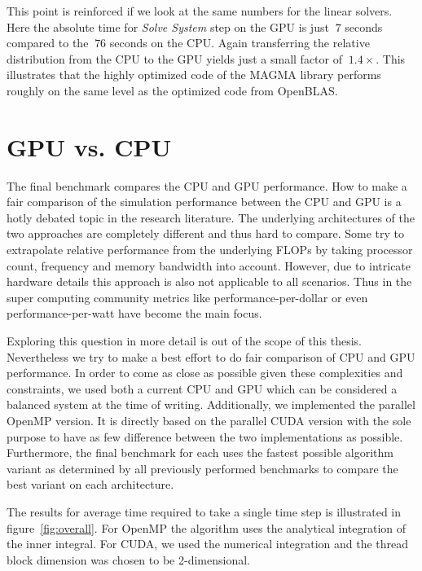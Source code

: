 \documentclass[a4paper,11pt]{kth-mag}
\begin{document}
This point is reinforced if we look at the same numbers for the linear solvers. Here the absolute time for \emph{Solve System} step on the GPU is just $~7$ seconds compared to the $~76$ seconds on the CPU. Again transferring the relative distribution from the CPU to the GPU yields just a small factor of $~1.4×$. This illustrates that the highly optimized code of the MAGMA library performs roughly on the same level as the optimized code from OpenBLAS.

\section{GPU vs. CPU}

The final benchmark compares the CPU and GPU performance. How to make a fair comparison of the simulation performance between the CPU and GPU is a hotly debated topic in the research literature\cite{Lee2010}\cite{Gregg2011}. The underlying architectures of the two approaches are completely different and thus hard to compare. Some try to extrapolate relative performance from the underlying FLOPs by taking processor count, frequency and memory bandwidth into account\cite{Lee2010}. However, due to intricate hardware details this approach is also not applicable to all scenarios. Thus in the super computing community metrics like performance-per-dollar or even performance-per-watt have become the main focus\cite{Kamil2008}.

Exploring this question in more detail is out of the scope of this thesis. Nevertheless we try to make a best effort to do fair comparison of CPU and GPU performance. In order to come as close as possible given these complexities and constraints, we used both a current CPU and GPU which can be considered a balanced system at the time of writing. Additionally, we implemented the parallel OpenMP version. It is directly based on the parallel CUDA version with the sole purpose to have as few difference between the two implementations as possible. Furthermore, the final benchmark for each uses the fastest possible algorithm variant as determined by all previously performed benchmarks to compare the best variant on each architecture.

The results for average time required to take a single time step is illustrated in figure~\ref{fig:overall}. For OpenMP the algorithm uses the analytical integration of the inner integral. For CUDA, we used the numerical integration and the thread block dimension was chosen to be 2-dimensional.
\end{document}
